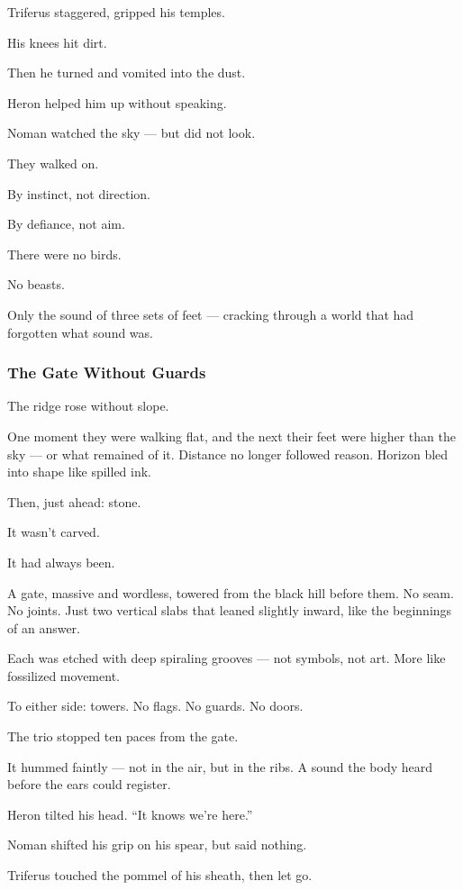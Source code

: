 \documentclass[12pt]{article}
\begin{document}
Triferus staggered, gripped his temples.

His knees hit dirt.

Then he turned and vomited into the dust.

Heron helped him up without speaking.

Noman watched the sky — but did not look.

\bigskip

They walked on.

By instinct, not direction.

By defiance, not aim.

There were no birds.

No beasts.

Only the sound of three sets of feet — cracking through a world that had forgotten what sound was.

\dotfill

\subsubsection{The Gate Without Guards}

The ridge rose without slope.

One moment they were walking flat, and the next their feet were higher than the sky — or what remained of it. Distance no longer followed reason. Horizon bled into shape like spilled ink.

Then, just ahead: stone.

It wasn’t carved.

It had always been.

A gate, massive and wordless, towered from the black hill before them. No seam. No joints. Just two vertical slabs that leaned slightly inward, like the beginnings of an answer.

Each was etched with deep spiraling grooves — not symbols, not art. More like fossilized movement.

To either side: towers. No flags. No guards. No doors.

\bigskip

The trio stopped ten paces from the gate.

It hummed faintly — not in the air, but in the ribs. A sound the body heard before the ears could register.

Heron tilted his head. “It knows we’re here.”

Noman shifted his grip on his spear, but said nothing.

Triferus touched the pommel of his sheath, then let go.
\end{document}
